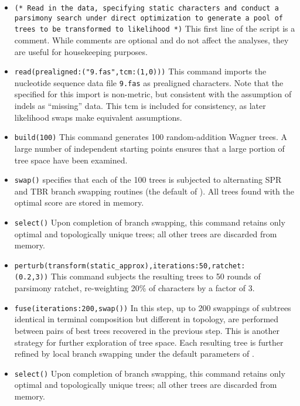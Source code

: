 \begin{itemize}

\item \texttt{(* Read in the data, specifying static characters and conduct a parsimony search under direct 
optimization to generate a pool of trees to be transformed to likelihood *)} This first line of the 
script is a comment. While comments are optional and do not affect the analyses, they are useful for 
housekeeping purposes.
\item \texttt{read(prealigned:("9.fas",tcm:(1,0)))} This command imports the nucleotide sequence data file 
\texttt{9.fas} as prealigned characters. Note that the  specified for this import is non-metric, 
but consistent with the assumption of indels as ``missing'' data. This tcm is included for consistency, as later 
likelihood swaps make equivalent assumptions.
\item \texttt{build(100)} This command generates 100 random-addition Wagner trees. A large number of 
independent starting points ensures that a large portion of tree space have been examined.
\item \texttt{swap()}  specifies that each of the 100 trees is subjected to alternating SPR and 
TBR branch swapping routines (the default of \poy). All trees found with the optimal score are stored in memory.
\item \texttt{select()} Upon completion of branch swapping, this command retains only optimal and topologically 
unique trees; all other trees are discarded from memory. 
\item \texttt{perturb(transform(static\_approx),iterations:50,ratchet:\\(0.2,3))} This command subjects the resulting 
trees to 50 rounds of parsimony ratchet, re-weighting 20\% of characters by a factor of 3.
\item \texttt{fuse(iterations:200,swap())} In this step, up to 200 swappings of subtrees identical in terminal 
composition but different in topology, are performed between pairs of best trees recovered in the previous step. 
This is another strategy for further exploration of tree space. Each resulting tree is further refined by local branch 
swapping under the default parameters of .
\item \texttt{select()} Upon completion of branch swapping, this command retains only optimal and topologically
 unique trees; all other trees are discarded from memory.
 

\end{itemize}
